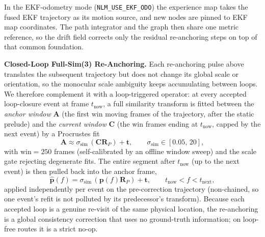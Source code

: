 In the EKF-odometry mode (\texttt{NLM\_USE\_EKF\_ODO}) the experience map takes the fused EKF trajectory as its motion source, and new nodes are pinned to EKF map coordinates. The path integrator and the graph then share one metric reference, so the drift field corrects only the residual re-anchoring steps on top of that common foundation.

\textbf{Closed-Loop Full-Sim(3) Re-Anchoring.} Each re-anchoring pulse above translates the subsequent trajectory but does not change its global scale or orientation, so the monocular scale ambiguity keeps accumulating between loops. We therefore complement it with a loop-triggered operator: at every accepted loop-closure event at frame $t_{\mathrm{now}}$, a full similarity transform is fitted between the \emph{anchor window} $\mathbf{A}$ (the first $\mathrm{win}$ moving frames of the trajectory, after the static prelude) and the \emph{current window} $\mathbf{C}$ (the $\mathrm{win}$ frames ending at $t_{\mathrm{now}}$, capped by the next event) by a Procrustes fit
\begin{equation}
    \mathbf{A} \approx \sigma_{\mathrm{sim}}\,(\mathbf{C}\mathbf{R}_{P}) + \mathbf{t}, \qquad \sigma_{\mathrm{sim}} \in [0.05,\,20],
\end{equation}
with $\mathrm{win} = 250$ frames (self-calibrated by an offline window sweep) and the scale gate rejecting degenerate fits. The entire segment after $t_{\mathrm{now}}$ (up to the next event) is then pulled back into the anchor frame,
\begin{equation}
    \hat{\mathbf{p}}(f) = \sigma_{\mathrm{sim}}\,(\mathbf{p}(f)\mathbf{R}_{P}) + \mathbf{t}, \qquad t_{\mathrm{now}} < f < t_{\mathrm{next}},
\end{equation}
applied independently per event on the pre-correction trajectory (non-chained, so one event's refit is not polluted by its predecessor's transform). Because each accepted loop is a genuine re-visit of the same physical location, the re-anchoring is a global consistency correction that uses no ground-truth information; on loop-free routes it is a strict no-op.
